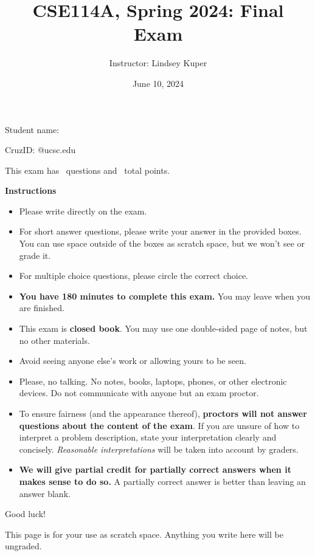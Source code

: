 \documentclass[addpoints]{exam}
\title{CSE114A, Spring 2024: Final Exam}
\author{Instructor: Lindsey Kuper}
\date{June 10, 2024}
\begin{document}
\maketitle

\begin{coverpages}

\bigskip  

\noindent Student name: \hrulefill

\bigskip
\bigskip

\noindent CruzID: \hrulefill @ucsc.edu

\bigskip
\bigskip

\noindent This exam has \numquestions~questions and \numpoints~total points.

\bigskip
\bigskip

\noindent \textbf{Instructions}

\begin{itemize}
\item Please write directly on the exam.
\item For short answer questions, please write your answer in the provided boxes.  You can use space outside of the boxes as scratch space, but we won't see or grade it.
\item For multiple choice questions, please circle the correct choice.
\item \textbf{You have 180 minutes to complete this exam.} You may leave when you are finished.
\item This exam is \textbf{closed book}.  You may use one double-sided page of notes, but no other materials.
\item Avoid seeing anyone else's work or allowing yours to be seen.
\item Please, no talking.  No notes, books, laptops, phones, or other electronic devices. Do not communicate with anyone but an exam proctor.
\item To ensure fairness (and the appearance thereof),
  \textbf{proctors will not answer questions about the content of the exam}. If you are unsure 
  of how to interpret a problem description, state your interpretation clearly and concisely. 
  \textit{Reasonable interpretations} will be taken into account by graders.
\item \textbf{We will give partial credit for partially correct answers when it makes sense to do so.} A partially correct answer is better than leaving an answer blank.
\end{itemize}

\bigskip

\noindent Good luck!

\newpage

This page is for your use as scratch space. Anything you write here will be ungraded.

\newpage  

\end{coverpages}
\end{document}

